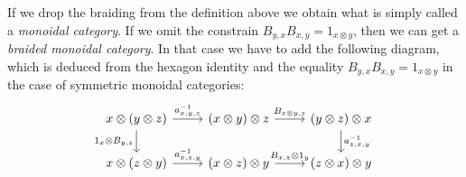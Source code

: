 \documentclass[TFM.tex]{subfiles}
\begin{document}
If we drop the braiding from the definition above we obtain what is simply called a \emph{monoidal category}. If we omit the constrain $B_{y,x}B_{x,y}=1_{x\otimes y}$, then we can get a \emph{braided monoidal category}. In that case we have to add the following diagram, which is deduced from the hexagon identity and the equality $B_{y,x}B_{x,y}=1_{x\otimes y}$ in the case of symmetric monoidal categories:
\[
\begin{tikzcd}
	x\otimes (y\otimes z) \arrow[r, "{a^{-1}_{x,y,z}}"] \arrow[d, "{1_x\otimes B_{y,z}}"'] & (x\otimes y)\otimes z \arrow[r, "{B_{x\otimes y, z}}"]   & (y\otimes z)\otimes x \arrow[d, "{a^{-1}_{z,x,y}}"] \\
	x\otimes (z\otimes y) \arrow[r, "{a^{-1}_{x,z,y}}"]                                    & (x\otimes z)\otimes y \arrow[r, "{B_{x,z}\otimes 1_y}"] & (z\otimes x)\otimes y                         
\end{tikzcd}
\]
\end{document}
